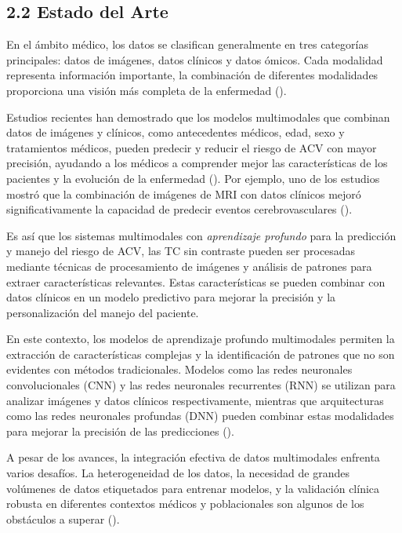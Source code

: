 \subsection{2.2 Estado del Arte } 

En el ámbito médico, los datos se clasifican generalmente en tres categorías principales: datos de imágenes, datos clínicos y datos ómicos. Cada modalidad representa información importante, la combinación de diferentes modalidades proporciona una visión más completa de la enfermedad (\cite{BEHRAD2022117006,Hel2021stroke}). 
\newline

Estudios recientes han demostrado que los modelos multimodales que combinan datos de imágenes y clínicos, como antecedentes médicos, edad, sexo y tratamientos médicos, pueden predecir y reducir el riesgo de ACV con mayor precisión, ayudando a los médicos a comprender mejor las características de los pacientes y la evolución de la enfermedad (\cite{Hel2021stroke,app10196791}). Por ejemplo, uno de los estudios mostró que la combinación de imágenes de MRI con datos clínicos mejoró significativamente la capacidad de predecir eventos cerebrovasculares (\cite{Fang2021stroke,BEHRAD2022117006,Gkantzios2023stroke}).
\newline

Es así que los sistemas multimodales con \textit{aprendizaje profundo} para la predicción y manejo del riesgo de ACV, las TC sin contraste pueden ser procesadas mediante técnicas de procesamiento de imágenes y análisis de patrones para extraer características relevantes. Estas características se pueden combinar con datos clínicos en un modelo predictivo para mejorar la precisión y la personalización del manejo del paciente.
\newline

En este contexto, los modelos de aprendizaje profundo multimodales permiten la extracción de características complejas y la identificación de patrones que no son evidentes con métodos tradicionales. Modelos como las redes neuronales convolucionales (CNN) y las redes neuronales recurrentes (RNN) se utilizan para analizar imágenes y datos clínicos respectivamente, mientras que arquitecturas como las redes neuronales profundas (DNN) pueden combinar estas modalidades para mejorar la precisión de las predicciones (\cite{app10196791,Chahine2023}).
\newline

A pesar de los avances, la integración efectiva de datos multimodales enfrenta varios desafíos. La heterogeneidad de los datos, la necesidad de grandes volúmenes de datos etiquetados para entrenar modelos, y la validación clínica robusta en diferentes contextos médicos y poblacionales son algunos de los obstáculos a superar (\cite{Chahine2023}).
\newline

